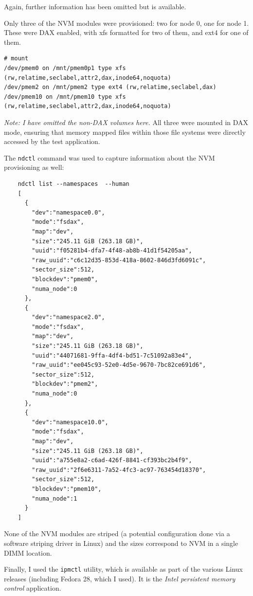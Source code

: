 Again, further information has been omitted but is available.

Only three of the NVM modules were provisioned: two for node 0, one for node 1.  These were
\acs{DAX} enabled, with xfs formatted for two of them, and ext4 for one of them.

\begin{verbatim}
# mount
/dev/pmem0 on /mnt/pmem0p1 type xfs (rw,relatime,seclabel,attr2,dax,inode64,noquota)
/dev/pmem2 on /mnt/pmem2 type ext4 (rw,relatime,seclabel,dax)
/dev/pmem10 on /mnt/pmem10 type xfs (rw,relatime,seclabel,attr2,dax,inode64,noquota)
\end{verbatim}

\textit{Note: I have omitted the non-\acs{DAX} volumes here.}  All three were mounted in \acs{DAX}
mode, ensuring that memory mapped files within those file systems were directly accessed by the
test application.

The \verb+ndctl+ command was used to capture information about the NVM provisioning as well:

\begin{verbatim}
    ndctl list --namespaces  --human
    [
      {
        "dev":"namespace0.0",
        "mode":"fsdax",
        "map":"dev",
        "size":"245.11 GiB (263.18 GB)",
        "uuid":"f05281b4-dfa7-4f48-ab8b-41d1f54205aa",
        "raw_uuid":"c6c12d35-853d-418a-8602-846d3fd6091c",
        "sector_size":512,
        "blockdev":"pmem0",
        "numa_node":0
      },
      {
        "dev":"namespace2.0",
        "mode":"fsdax",
        "map":"dev",
        "size":"245.11 GiB (263.18 GB)",
        "uuid":"44071681-9ffa-4df4-bd51-7c51092a83e4",
        "raw_uuid":"ee045c93-52e0-4d5e-9670-7bc82ce691d6",
        "sector_size":512,
        "blockdev":"pmem2",
        "numa_node":0
      },
      {
        "dev":"namespace10.0",
        "mode":"fsdax",
        "map":"dev",
        "size":"245.11 GiB (263.18 GB)",
        "uuid":"a755e8a2-c6ad-426f-8841-cf393bc2b4f9",
        "raw_uuid":"2f6e6311-7a52-4fc3-ac97-763454d18370",
        "sector_size":512,
        "blockdev":"pmem10",
        "numa_node":1
      }
    ]
\end{verbatim}

None of the NVM modules are striped (a potential configuration done via a software striping driver in Linux)
and the sizes correspond to NVM in a single DIMM location.

Finally, I used the \verb+ipmctl+ utility, which is available as part of the various Linux releases (including
Fedora 28, which I used).  It is the \textit{Intel persistent memory control} application.


